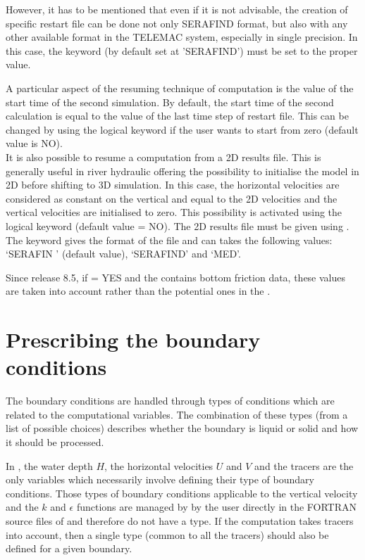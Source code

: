 However, it has to be mentioned that even if it is not advisable, the creation
of specific restart file can be done not only SERAFIND format, but also with
any other available format in the TELEMAC system, especially in single
precision. In this case, the keyword  (by default
set at 'SERAFIND') must be set to the proper value.

A particular aspect of the resuming technique of computation is the value of
the start time of the second simulation. By default, the start time of the
second calculation is equal to the value of the last time step of restart file.
This can be changed by using the logical keyword  if the user wants to start from zero (default value is NO).
\\

It is also possible to resume a computation from a 2D results file. This is
generally useful in river hydraulic offering the possibility to initialise the
model in 2D before shifting to 3D simulation. In this case, the horizontal
velocities are considered as constant on the vertical and equal to the 2D
velocities and the vertical velocities are initialised to zero. This
possibility is activated using the  logical keyword
(default value = NO). The 2D results file must be given using . The keyword  gives
the format of the file and can takes the following values: `SERAFIN ' (default
value), `SERAFIND' and `MED'.

Since release 8.5, if  = YES and the
 contains bottom friction data, these values
are taken into account rather than the potential ones in the
.

\section{Prescribing the boundary conditions}
\label{sec:prescr_BC}

The boundary conditions are handled through types of conditions which are
related to the computational variables. The combination of these types (from a
list of possible choices) describes whether the boundary is liquid or solid and
how it should be processed.

In , the water depth $H$, the horizontal velocities $U$
and $V$ and the tracers are the only variables which necessarily involve
defining their type of boundary conditions. Those types of boundary conditions
applicable to the vertical velocity and the $k$ and $\epsilon$ functions
are managed by  by the user directly in the FORTRAN source files of
 and therefore do not have a type. If the computation takes tracers
into account, then a single type (common to all the tracers) should also be
defined for a given boundary.

